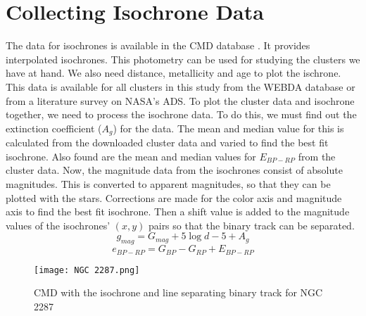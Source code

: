 \section{Collecting Isochrone Data}
The data for isochrones is available in the CMD database \citep{cmdSite}. It provides interpolated isochrones. This photometry can be used for studying the clusters we have at hand. We also need distance, metallicity and age to plot the ischrone. This data is available for all clusters in this study from the WEBDA database \citep{webda} or from a literature survey on NASA's ADS. To plot the cluster data and isochrone together, we need to process the isochrone data. To do this, we must find out the extinction coefficient ($A_g$) for the data. The mean and median value for this is calculated from the downloaded cluster data and varied to find the best fit isochrone. Also found are the mean and median values for $E_{BP-RP}$ from the cluster data. Now, the magnitude data from the isochrones consist of absolute magnitudes. This is converted to apparent magnitudes, so that they can be plotted with the stars. Corrections are made for the color axis and magnitude axis to find the best fit isochrone. Then a shift value is added to the magnitude values of the isochrones' $(x,y)$ pairs so that the binary track can be separated.
$$g_{mag} = G_{mag} + 5 \log d - 5 + A_g$$
$$e_{BP-RP} = G_{BP} - G_{RP} + E_{BP-RP}$$

\begin{figure}[h]
	\centering
	\texttt{[image: NGC 2287.png]}
	\caption{CMD with the isochrone and line separating binary track for NGC 2287}
	\label{fig:im3}
\end{figure}


